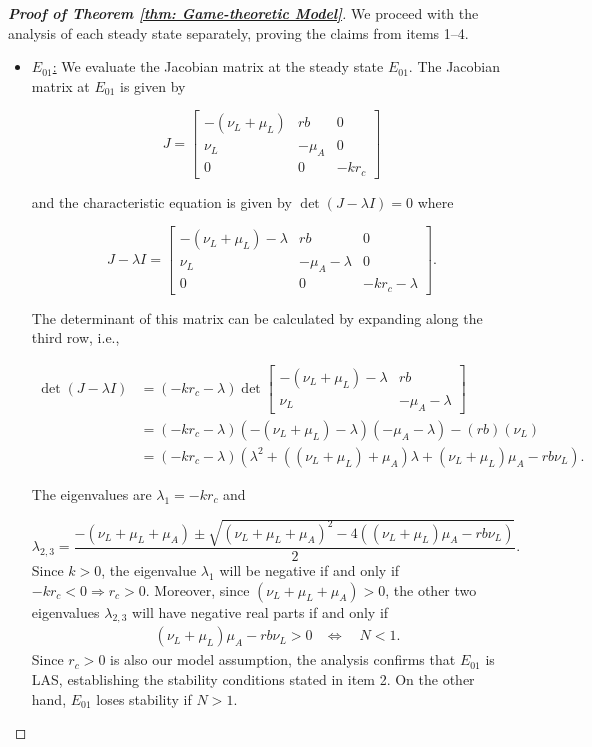 \documentclass{article}
\theoremstyle{remark}
\theoremstyle{custom} %
\begin{document}
\begin{proof}[\textbf{Proof of Theorem \ref{thm: Game-theoretic Model}}]

 We proceed with the analysis of each steady state separately, proving the claims from items 1--4. 

 
\begin{itemize}


\item \underline{$E_{01}$:} We evaluate the Jacobian matrix at the steady state $E_{01}$. The Jacobian matrix at $E_{01}$ is given by

\[
J = \begin{bmatrix}
- (\nu_L + \mu_L) & r b & 0 \\
\nu_L & -\mu_A & 0 \\
0 & 0 & -k r_c
\end{bmatrix}
\]

and the characteristic equation is given by \(\det(J - \lambda I) = 0\) where 

\[
J - \lambda I = \begin{bmatrix}
- (\nu_L + \mu_L) - \lambda & r b & 0 \\
\nu_L & -\mu_A - \lambda & 0 \\
0 & 0 & -k r_c - \lambda
\end{bmatrix}.
\]

The determinant of this matrix can be calculated by expanding along the third row, i.e.,

$$ 
\begin{aligned}
\operatorname{det}(J-\lambda I) & =(-k r_c-\lambda)  \operatorname{det}\left[\begin{array}{cc}
-\left(\nu_L+\mu_L\right)-\lambda & r b \\
\nu_L & -\mu_A-\lambda
\end{array}\right] \\
& =(-k r_c-\lambda)\left(-\left(\nu_L+\mu_L\right)-\lambda\right)\left(-\mu_A-\lambda\right)-(r b)\left(\nu_L\right) \\
& =(-k r_c-\lambda)\left(\lambda^2+\left(\left(\nu_L+\mu_L\right)+\mu_A\right) \lambda+\left(\nu_L+\mu_L\right) \mu_A-r b \nu_L\right).
\end{aligned}
$$


The eigenvalues are \(\lambda_1 = -k r_c\) and 

$$
\lambda_{2,3} = \frac{-\left(\nu_L + \mu_L + \mu_A\right) \pm \sqrt{\left(\nu_L + \mu_L + \mu_A\right)^2 - 4\left((\nu_L + \mu_L) \mu_A - r b \nu_L\right)}}{2}.
$$
Since $k>0$, the eigenvalue \(\lambda_1\) will be negative if and only if \(-k r_c < 0 \Rightarrow r_c > 0\). Moreover, since  $(\nu_L + \mu_L + \mu_A) > 0 $,  the other two eigenvalues \(\lambda_{2,3}\) will have negative real parts if and only if
$$
\begin{aligned}
& \left(\nu_L+\mu_L\right) \mu_A-r b \nu_L>0 
& \Leftrightarrow\quad {N}<1.
\end{aligned}
$$
Since $r_c > 0$ is also our model assumption, the analysis confirms that $E_{01}$ is LAS, establishing the stability conditions stated in item 2. On the other hand, $E_{01}$ loses stability if $N>1$.



\end{itemize}
\end{proof}
\end{document}
